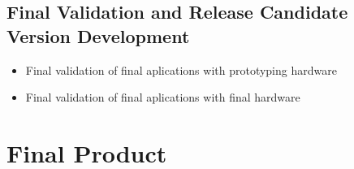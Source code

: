 		\subsection{Final Validation and Release Candidate Version Development}
		\begin{itemize}
		\item Final validation of final aplications with prototyping hardware
		\item Final validation of final aplications with final hardware
		\end{itemize}
		

		\section{Final Product}
